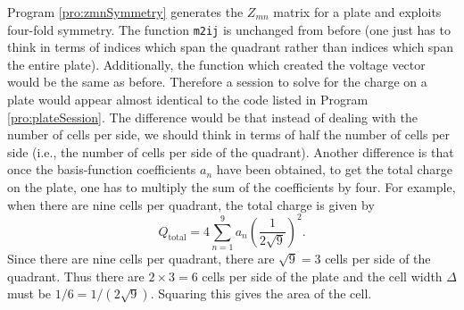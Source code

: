 Program \ref{pro:zmnSymmetry} generates the $Z_{mn}$ matrix for a
plate and exploits four-fold symmetry.  The function {\tt m2ij} is
unchanged from before (one just has to think in terms of indices which
span the quadrant rather than indices which span the entire plate).
Additionally, the function which created the voltage vector would be
the same as before.  Therefore a session to solve for the charge on a
plate would appear almost identical to the code listed in Program
\ref{pro:plateSession}.  The difference would be that instead of
dealing with the number of cells per side, we should think in terms of
half the number of cells per side (i.e., the number of cells per side
of the quadrant).  Another difference is that once the basis-function
coefficients $a_n$ have been obtained, to get the total charge on the
plate, one has to multiply the sum of the coefficients by four.  For
example, when there are nine cells per quadrant, the total charge is
given by
\begin{equation}
  Q_{\text{total}} = 4 \sum_{n=1}^{9} a_n \left(\frac{1}{2\sqrt{9}}\right)^2.
\end{equation}
Since there are nine cells per quadrant, there are $\sqrt{9}=3$ cells
per side of the quadrant.  Thus there are $2\times 3=6$ cells per side
of the plate and the cell width $\Delta$ must be $1/6 =
1/(2\sqrt{9})$.  Squaring this gives the area of the cell.
